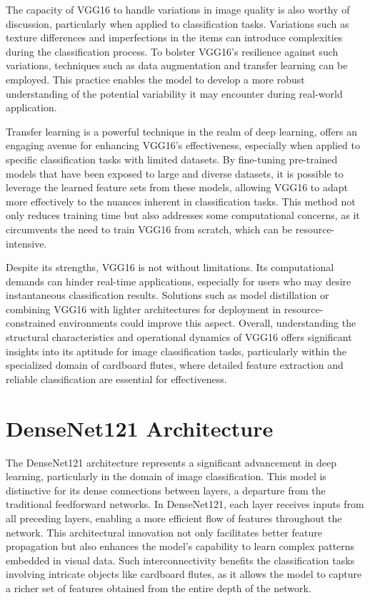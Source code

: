 The capacity of VGG16 to handle variations in image quality is also worthy of discussion, particularly when applied to classification tasks. Variations such as texture differences and imperfections in the items can introduce complexities during the classification process. To bolster VGG16's resilience against such variations, techniques such as data augmentation and transfer learning can be employed. This practice enables the model to develop a more robust understanding of the potential variability it may encounter during real-world application.


Transfer learning is a powerful technique in the realm of deep learning, offers an engaging avenue for enhancing VGG16's effectiveness, especially when applied to specific classification tasks with limited datasets. By fine-tuning pre-trained models that have been exposed to large and diverse datasets, it is possible to leverage the learned feature sets from these models, allowing VGG16 to adapt more effectively to the nuances inherent in classification tasks. This method not only reduces training time but also addresses some computational concerns, as it circumvents the need to train VGG16 from scratch, which can be resource-intensive.


Despite its strengths, VGG16 is not without limitations. Its computational demands can hinder real-time applications, especially for users who may desire instantaneous classification results. Solutions such as model distillation or combining VGG16 with lighter architectures for deployment in resource-constrained environments could improve this aspect. Overall, understanding the structural characteristics and operational dynamics of VGG16 offers significant insights into its aptitude for image classification tasks, particularly within the specialized domain of cardboard flutes, where detailed feature extraction and reliable classification are essential for effectiveness.

\section{DenseNet121 Architecture}

The DenseNet121 architecture represents a significant advancement in deep learning, particularly in the domain of image classification. This model is distinctive for its dense connections between layers, a departure from the traditional feedforward networks. In DenseNet121, each layer receives inputs from all preceding layers, enabling a more efficient flow of features throughout the network. This architectural innovation not only facilitates better feature propagation but also enhances the model's capability to learn complex patterns embedded in visual data. Such interconnectivity benefits the classification tasks involving intricate objects like cardboard flutes, as it allows the model to capture a richer set of features obtained from the entire depth of the network.


